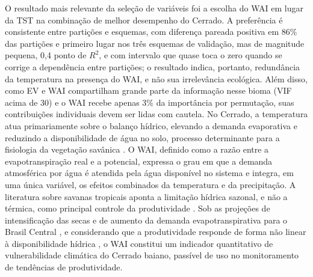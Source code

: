\documentclass[a4paper,fleqn]{cas-sc}
\begin{document}
O resultado mais relevante da seleção de variáveis foi a escolha do WAI em lugar da TST na combinação de melhor desempenho do Cerrado. A preferência é consistente entre partições e esquemas, com diferença pareada positiva em 86\% das partições e primeiro lugar nos três esquemas de validação, mas de magnitude pequena, 0,4 ponto de $R^2$, e com intervalo que quase toca o zero quando se corrige a dependência entre partições; o resultado indica, portanto, redundância da temperatura na presença do WAI, e não sua irrelevância ecológica. Além disso, como EV e WAI compartilham grande parte da informação nesse bioma (VIF acima de 30) e o WAI recebe apenas 3\% da importância por permutação, suas contribuições individuais devem ser lidas com cautela. No Cerrado, a temperatura atua primariamente sobre o balanço hídrico, elevando a demanda evaporativa e reduzindo a disponibilidade de água no solo, processo determinante para a fisiologia da vegetação savânica \citep{bucci2008,arruda2016}. O WAI, definido como a razão entre a evapotranspiração real e a potencial, expressa o grau em que a demanda atmosférica por água é atendida pela água disponível no sistema e integra, em uma única variável, os efeitos combinados da temperatura e da precipitação. A literatura sobre savanas tropicais aponta a limitação hídrica sazonal, e não a térmica, como principal controle da produtividade \citep{vourlitis2022}. Sob as projeções de intensificação das secas e de aumento da demanda evapotranspirativa para o Brasil Central \citep{ipcc2022}, e considerando que a produtividade responde de forma não linear à disponibilidade hídrica \citep{mwangi2025}, o WAI constitui um indicador quantitativo de vulnerabilidade climática do Cerrado baiano, passível de uso no monitoramento de tendências de produtividade.
\end{document}
